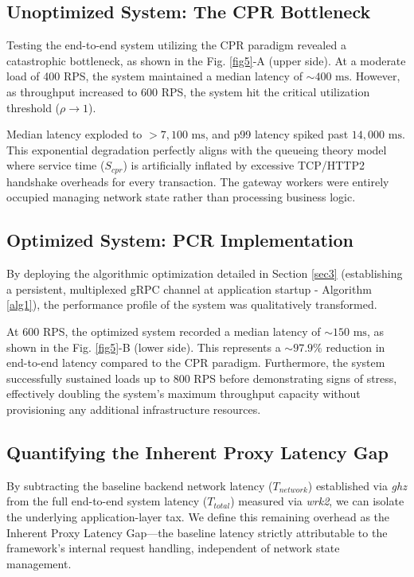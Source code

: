 \documentclass{ieeeaccess}
\begin{document}
\subsection{Unoptimized System: The CPR Bottleneck}
\label{sec5.2}

Testing the end-to-end system utilizing the CPR paradigm revealed a catastrophic bottleneck, as shown in the Fig. \ref{fig5}-A (upper side). At a moderate load of 400 RPS, the system maintained a median latency of $\sim 400 \text{ ms}$. However, as throughput increased to 600 RPS, the system hit the critical utilization threshold ($\rho \to 1$).

Median latency exploded to $> 7,100 \text{ ms}$, and p99 latency spiked past $14,000 \text{ ms}$. This exponential degradation perfectly aligns with the queueing theory model where service time ($S_{cpr}$) is artificially inflated by excessive TCP/HTTP2 handshake overheads for every transaction. The gateway workers were entirely occupied managing network state rather than processing business logic.

\subsection{Optimized System: PCR Implementation}
\label{sec5.3}

By deploying the algorithmic optimization detailed in Section \ref{sec3} (establishing a persistent, multiplexed gRPC channel at application startup - Algorithm \ref{alg1}), the performance profile of the system was qualitatively transformed.

At 600 RPS, the optimized system recorded a median latency of $\sim 150 \text{ ms}$, as shown in the Fig. \ref{fig5}-B (lower side). This represents a $\sim 97.9\%$ reduction in end-to-end latency compared to the CPR paradigm. Furthermore, the system successfully sustained loads up to 800 RPS before demonstrating signs of stress, effectively doubling the system's maximum throughput capacity without provisioning any additional infrastructure resources.

\subsection{Quantifying the Inherent Proxy Latency Gap}
\label{sec5.4}

By subtracting the baseline backend network latency ($T_{network}$) established via \textit{ghz} from the full end-to-end system latency ($T_{total}$) measured via \textit{wrk2}, we can isolate the underlying application-layer tax. We define this remaining overhead as the Inherent Proxy Latency Gap---the baseline latency strictly attributable to the framework's internal request handling, independent of network state management.
\end{document}
